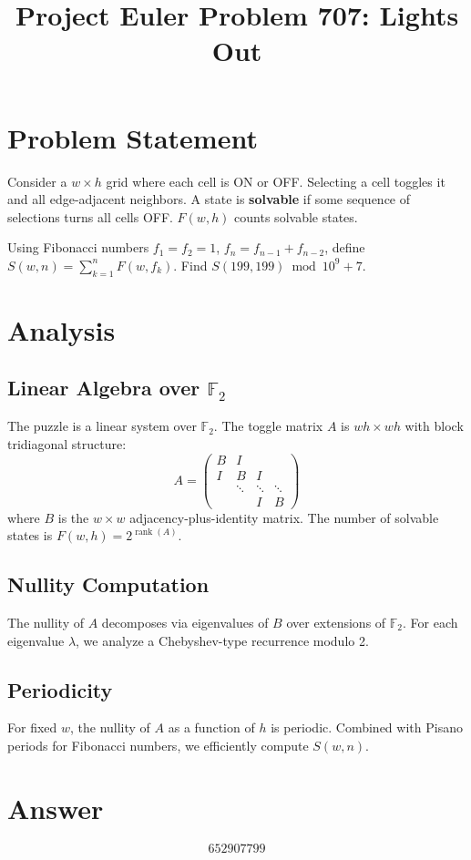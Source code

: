 \documentclass[12pt]{article}
\title{Project Euler Problem 707: Lights Out}
\author{}
\date{}
\begin{document}
\maketitle

\section{Problem Statement}
Consider a $w \times h$ grid where each cell is ON or OFF. Selecting a cell toggles it and all edge-adjacent neighbors. A state is \textbf{solvable} if some sequence of selections turns all cells OFF. $F(w,h)$ counts solvable states.

Using Fibonacci numbers $f_1=f_2=1$, $f_n=f_{n-1}+f_{n-2}$, define $S(w,n)=\sum_{k=1}^n F(w,f_k)$. Find $S(199,199) \bmod 10^9+7$.

\section{Analysis}

\subsection{Linear Algebra over $\mathbb{F}_2$}
The puzzle is a linear system over $\mathbb{F}_2$. The toggle matrix $A$ is $wh \times wh$ with block tridiagonal structure:
\[
A = \begin{pmatrix} B & I \\ I & B & I \\ & \ddots & \ddots & \ddots \\ & & I & B \end{pmatrix}
\]
where $B$ is the $w \times w$ adjacency-plus-identity matrix. The number of solvable states is $F(w,h) = 2^{\operatorname{rank}(A)}$.

\subsection{Nullity Computation}
The nullity of $A$ decomposes via eigenvalues of $B$ over extensions of $\mathbb{F}_2$. For each eigenvalue $\lambda$, we analyze a Chebyshev-type recurrence modulo 2.

\subsection{Periodicity}
For fixed $w$, the nullity of $A$ as a function of $h$ is periodic. Combined with Pisano periods for Fibonacci numbers, we efficiently compute $S(w,n)$.

\section{Answer}

\[
\boxed{652907799}
\]
\end{document}
